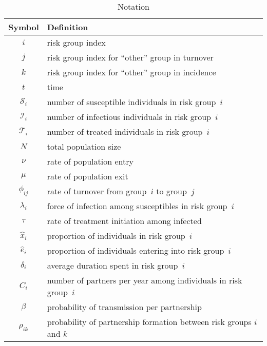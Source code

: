 \begin{table}[H]
  \centering
  \caption{Notation}
  \label{tab:notation}
  \small\renewcommand{\arraystretch}{0.8}
  \begin{tabular}{cl}
    \toprule
        Symbol      & Definition                                                           \\
    \midrule
          $i$       & risk group index                                                     \\
          $j$       & risk group index for ``other'' group in turnover                     \\
          $k$       & risk group index for ``other'' group in incidence                    \\
          $t$       & time                                                                 \\
    $\mathcal{S}_i$ & number of susceptible individuals in risk group~$i$                  \\
    $\mathcal{I}_i$ & number of infectious individuals in risk group~$i$                   \\
    $\mathcal{T}_i$ & number of treated individuals in risk group~$i$                      \\
          $N$       & total population size                                                \\
         $\nu$      & rate of population entry                                             \\
         $\mu$      & rate of population exit                                              \\
      $\phi_{ij}$   & rate of turnover from group~$i$ to group~$j$                         \\
      $\lambda_i$   & force of infection among susceptibles in risk group~$i$              \\
        $\tau$      & rate of treatment initiation among infected                          \\
      $\hat{x}_i$   & proportion of individuals in risk group~$i$                          \\
      $\hat{e}_i$   & proportion of individuals entering into risk group~$i$               \\
      $\delta_i$    & average duration spent in risk group~$i$                             \\
         $C_i$      & number of partners per year among individuals in risk group~$i$      \\
        $\beta$     & probability of transmission per partnership                          \\
      $\rho_{ik}$   & probability of partnership formation between risk groups $i$ and $k$ \\
    \bottomrule
  \end{tabular}
\end{table}

